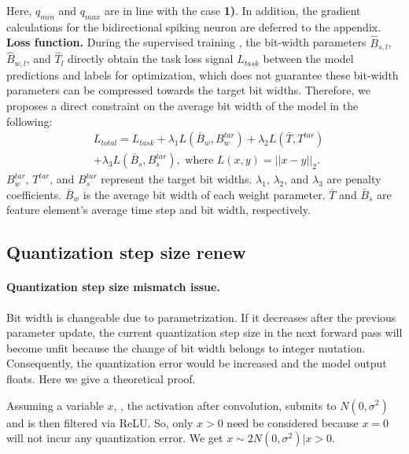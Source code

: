 Here, $q_{min}$ and $q_{max}$ are in line with the case \textbf{1)}.
In addition, the gradient calculations for the bidirectional spiking neuron are deferred to the appendix.
\\\textbf{Loss function.} During the supervised training , the bit-width parameters $\hat{B}_{s,l}$, $\hat{B}_{w,l}$, and $\hat{T}_l$ directly obtain the task loss signal $L_{task}$ between the model predictions and labels for optimization, which does not guarantee these bit-width parameters can be compressed towards the target bit widths. Therefore, we proposes a direct constraint on the average bit width of the model in the following:
\begin{equation}
\begin{split}
& L_{total}=L_{task}+\lambda_1L(\bar{B}_w, B^{tar}_w)+\lambda_2L(\bar{T}, T^{tar})\\
&+\lambda_3L(\bar{B}_s, B^{tar}_s), \text{ where } L(x,y)=|| x-y||_2.
\end{split}
\end{equation}
\( B^{tar}_w \), \( T^{tar} \), and \( B^{tar}_s \) represent the target bit widths. \( \lambda_1 \), \( \lambda_2 \), and \( \lambda_3 \) are penalty coefficients. \( \bar{B}_w \) is the average bit width of each weight parameter. \( \bar{T} \) and \( \bar{B}_s \) are feature element's average time step and bit width, respectively.

\subsection{Quantization step size renew}
\label{sbsec:renew}
\paragraph{Quantization step size mismatch issue.} 
Bit width is changeable due to parametrization. If it decreases after the previous parameter update, the current quantization step size in the next forward pass will become unfit because the change of bit width belongs to integer mutation. Consequently, the quantization error would be increased and the model output floats. Here we give a theoretical proof. 

Assuming a variable $x$, \eg, the activation after convolution, submits to $N(0,\sigma^2)$ and is then filtered via ReLU. So, only $x>0$ need be considered because $x=0$ will not incur any quantization error.  We get $x\sim 2N(0,\sigma^2)| x>0$.

